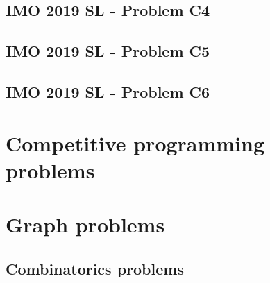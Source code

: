 \documentclass[12pt,openany,oneside]{book}
\theoremstyle{definition}
\numberwithin{definition}{section}
\numberwithin{theorem}{section}
\numberwithin{corollary}{section}
\numberwithin{proposition}{section}
\numberwithin{notation}{section}
\numberwithin{remark}{section}
\numberwithin{hypothesis}{section}
\begin{document}
\section{IMO 2019 SL - Problem C4}
\section{IMO 2019 SL - Problem C5}
\section{IMO 2019 SL - Problem C6}

\chapter{Competitive programming problems}

\chapter{Graph problems}
\section{Combinatorics problems}



\end{document}
